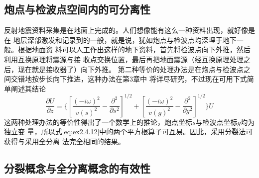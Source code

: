 \subsection{炮点与检波点空间内的可分离性}
\label{sec:2.4.7}

反射地震资料采集是在地面上完成的。人们想像能有这么一种资料出现，就好像是在
地层深部激发和记录到的一般，就是说，犹如炮点与检波点均深埋于地下一般。根据地面资
料可以人工作出这样的地下资料，首先将检波点向下外推，然后利用互换原理将震源与接
收点交换位置，最后再把地面震源（经互换原理处理之后，现在就是接收器了）向下外推。
第二种等价的处理办法是在炮点与检波点之间交错地按步长向下推进，这种办法在第3章中
将详尽研究，不过现在可用下式简单阐述其结论
\begin{equation}
\frac{\partial U}{\partial z}=\{
[\frac{(-i\omega)^2}{v(s)^2}-\frac{\partial^2}{\partial s^2}]^{1/2}+
[\frac{(-i\omega)^2}{v(g)^2}-\frac{\partial^2}{\partial g^2}]^{1/2}
\}U
\label{eq:ex2.4.12}
\end{equation}
这两种处理办法的等价性得出了一个数学上的推论，炮点坐标$s$与检波点坐标$g$均为独立变
量，所以式\ref{eq:ex2.4.12}中的两个平方根算子可互易。因此，采用分裂法可获得与采用全分离
法完全相同的结果。

\subsection{分裂概念与全分离概念的有效性}
\label{sec:2.4.8}
